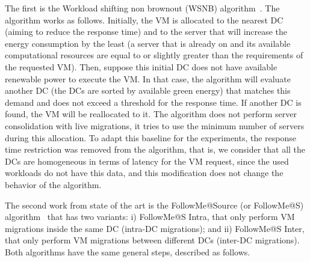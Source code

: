 The first is the Workload shifting non brownout (WSNB) algorithm~\cite{XU2020191}. The algorithm works as follows. Initially, the VM is allocated to the nearest DC (aiming to reduce the response time) and to the server that will increase the energy consumption by the least (a server that is already on and its available computational resources are equal to or slightly greater than the requirements of the requested VM). Then, suppose this initial DC does not have available renewable power to execute the VM. In that case, the algorithm will evaluate another DC (the DCs are sorted by available green energy) that matches this demand and does not exceed a threshold for the response time. If another DC is found, the VM will be reallocated to it. The algorithm does not perform server consolidation with live migrations, it tries to use the minimum number of servers during this allocation. To adapt this baseline for the experiments, the response time restriction was removed from the algorithm, that is, we consider that all the DCs are homogeneous in terms of latency for the VM request, since the used workloads do not have this data, and this modification does not change the behavior of the algorithm.

The second work from state of the art is the FollowMe@Source (or FollowMe@S) algorithm~\cite{ALI2021110907} that has two variants: i) FollowMe@S Intra, that only perform VM migrations inside the same DC (intra-DC migrations);  and ii) FollowMe@S Inter, that only perform VM migrations between different DCs (inter-DC migrations). Both algorithms have the same general steps, described as follows.


